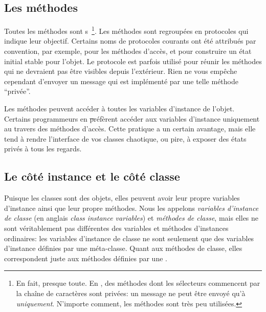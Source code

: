 \documentclass[a4paper,10pt,twoside]{book}
\begin{document}
\subsection{Les méthodes}

Toutes les méthodes sont s~\footnote{En fait, presque toute.  En \pharo, des méthodes dont les sélecteurs commencent par
la chaîne de caractères  sont privées: un message 
ne peut être envoyé qu'à \self \emph{uniquement}.  N'importe comment, les méthodes  sont très peu utilisées.}.
Les méthodes sont regroupées en protocoles qui indique leur objectif.
Certains noms de protocoles courants ont été attribués par convention,
par exemple,  pour les méthodes d'accès, et  pour construire un état initial stable pour l'objet.
Le protocole  est parfois utilisé pour réunir les
méthodes qui ne devraient pas être visibles depuis l'extérieur.
Rien ne vous empêche cependant d'envoyer un message qui est implémenté
par une telle méthode ``privée''.

Les méthodes peuvent accéder à toutes les variables d'instance de l'objet.
Certains programmeurs en \st préfèrent accéder aux variables d'instance
uniquement au travers des méthodes d'accès.
Cette pratique a un certain avantage, mais elle tend à rendre l'interface de vos classes chaotique, ou pire, à exposer des états privés à tous les regards.

\subsection{Le côté instance et le côté classe}

Puisque les classes sont des objets, elles peuvent avoir leur propre variables d'instance ainsi que leur propre méthodes.
Nous les appelons \emph{variables d'instance de classe} (en anglais \emph{class instance variables}) et \emph{méthodes de classe}, mais elles ne sont véritablement pas différentes des variables et méthodes d'instances ordinaires:
les variables d'instance de classe ne sont seulement que des variables d'instance définies par une méta-classe. Quant aux méthodes de classe,
elles correspondent juste aux méthodes définies par une . 
\end{document}
